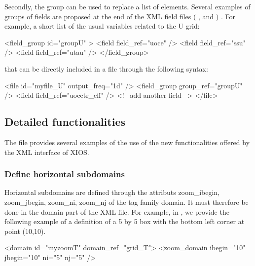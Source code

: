 \documentclass[../main/NEMO_manual]{subfiles}
\begin{document}
Secondly, the group can be used to replace a list of elements.
Several examples of groups of fields are proposed at the end of the XML field files (
,
 and
 ) .
For example, a short list of the usual variables related to the U grid:

\begin{xmllines}
<field_group id="groupU" >
	<field field_ref="uoce"  />
	<field field_ref="ssu" />
	<field field_ref="utau"  />
</field_group>
\end{xmllines}

that can be directly included in a file through the following syntax:

\begin{xmllines}
<file id="myfile_U" output_freq="1d" />
	<field_group group_ref="groupU" />
	<field field_ref="uocetr_eff"   />  <!-- add another field -->
</file>
\end{xmllines}

\subsection{Detailed functionalities}

The file  provides several examples of the use of
the new functionalities offered by the XML interface of XIOS.

\subsubsection{Define horizontal subdomains}

Horizontal subdomains are defined through the attributs zoom\_ibegin, zoom\_jbegin, zoom\_ni, zoom\_nj of
the tag family domain.
It must therefore be done in the domain part of the XML file.
For example, in , we provide the following example of a definition of
a 5 by 5 box with the bottom left corner at point (10,10).

\begin{xmllines}
<domain id="myzoomT" domain_ref="grid_T">
	<zoom_domain ibegin="10" jbegin="10" ni="5" nj="5" />
\end{xmllines}
\end{document}
